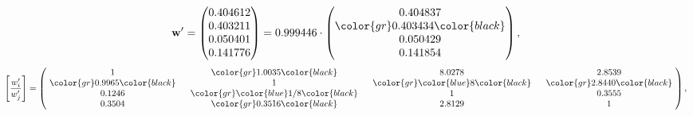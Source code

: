 \begin{example}
\begin{equation*}
\mathbf{w}^{\prime} =
\begin{pmatrix}
0.404612\\
0.403211\\
0.050401\\
0.141776
\end{pmatrix} =
0.999446\cdot
\begin{pmatrix}
0.404837\\
\color{gr} 0.403434\color{black} \\
0.050429\\
0.141854
\end{pmatrix},
\end{equation*}
\begin{equation*}
\left[ \frac{{w}^{\prime}_i}{{w}^{\prime}_j} \right] =
\begin{pmatrix}
$\,\,$ 1 $\,\,$ & $\,\,$\color{gr} 1.0035\color{black} $\,\,$ & $\,\,$8.0278$\,\,$ & $\,\,$2.8539$\,\,$ \\
$\,\,$\color{gr} 0.9965\color{black} $\,\,$ & $\,\,$ 1 $\,\,$ & $\,\,$\color{gr} \color{blue} 8\color{black} $\,\,$ & $\,\,$\color{gr} 2.8440\color{black}   $\,\,$ \\
$\,\,$0.1246$\,\,$ & $\,\,$\color{gr} \color{blue}  1/8\color{black} $\,\,$ & $\,\,$ 1 $\,\,$ & $\,\,$0.3555 $\,\,$ \\
$\,\,$0.3504$\,\,$ & $\,\,$\color{gr} 0.3516\color{black} $\,\,$ & $\,\,$2.8129$\,\,$ & $\,\,$ 1  $\,\,$ \\
\end{pmatrix},
\end{equation*}
\end{example}
\newpage
